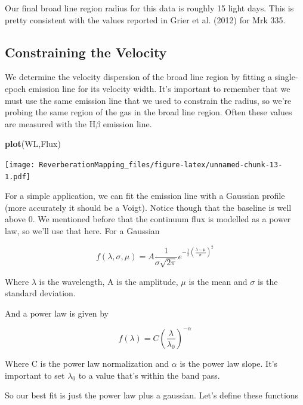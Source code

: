 \documentclass[]{article}
\newenvironment{Shaded}{\begin{snugshade}}{\end{snugshade}}
\newcommand{\KeywordTok}[1]{\textcolor[rgb]{0.13,0.29,0.53}{\textbf{#1}}}
\newcommand{\NormalTok}[1]{#1}
\begin{document}
Our final broad line region radius for this data is roughly 15 light
days. This is pretty consistent with the values reported in Grier et al.
(2012) for Mrk 335.

\hypertarget{constraining-the-velocity}{%
\subsection{Constraining the Velocity}\label{constraining-the-velocity}}

We determine the velocity dispersion of the broad line region by fitting
a single-epoch emission line for its velocity width. It's important to
remember that we must use the same emission line that we used to
constrain the radius, so we're probing the same region of the gas in the
broad line region. Often these values are measured with the H\(\beta\)
emission line.

\begin{Shaded}
\begin{Highlighting}[]
\KeywordTok{plot}\NormalTok{(WL,Flux)}
\end{Highlighting}
\end{Shaded}

\texttt{[image: ReverberationMapping\_files/figure-latex/unnamed-chunk-13-1.pdf]}

For a simple application, we can fit the emission line with a Gaussian
profile (more accurately it should be a Voigt). Notice though that the
baseline is well above 0. We mentioned before that the continuum flux is
modelled as a power law, so we'll use that here. For a Gaussian

\[f(\lambda,\sigma,\mu)=A\frac{1}{\sigma\sqrt{2\pi}}e^{-\frac{1}{2}(\frac{\lambda-\mu}{\sigma})^2}\]

Where \(\lambda\) is the wavelength, A is the amplitude, \(\mu\) is the
mean and \(\sigma\) is the standard deviation.

And a power law is given by

\[f(\lambda)=C(\frac{\lambda}{\lambda_0})^{-\alpha}\]

Where C is the power law normalization and \(\alpha\) is the power law
slope. It's important to set \(\lambda_0\) to a value that's within the
band pass.

So our best fit is just the power law plus a gaussian. Let's define
these functions
\end{document}
